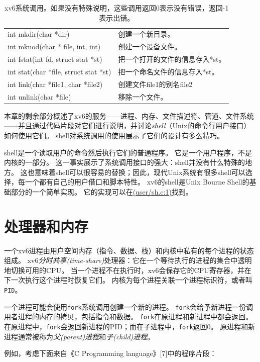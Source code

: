 \begin{table}[htbp]
\begin{tabular}{ll}
        int mkdir(char *dir)  & 创建一个新目录。    \\
        int mknod(char * file, int, int)   & 创建一个设备文件。  \\
        int fstat(int fd, struct stat *st)       & 把一个打开的文件的信息存入*st。  \\
        int stat(char *file, struct stat *st) &  把一个命名文件的信息存入*st。\\
        int link(char *file1, char *file2)    & 创建文件file1的别名file2    \\
        int unlink(char *file)& 移除一个文件。 \\
    \end{tabular}
    \caption{xv6系统调用。如果没有特殊说明，这些调用返回0表示没有错误，返回-1表示出错。}
    \label{t1-1}
\end{table}

本章的剩余部分概述了xv6的服务——进程、内存、文件描述符、管道、文件系统——并且通过代码片段对它们进行说明，并讨论\emph{shell}（Unix的命令行用户接口）如何使用它们。
shell对系统调用的使用展示了它们的设计有多么精巧。

shell是一个读取用户的命令然后执行它们的普通程序。
它是一个用户程序，不是内核的一部分。
这一事实展示了系统调用接口的强大：shell并没有什么特殊的地方。
这也意味着shell可以很容易的替换；因此，现代Unix系统有很多shell可以选择，每一个都有自己的用户借口和脚本特性。
xv6的shell是Unix Bourne Shell的基础部分的一个简单实现。
它的实现可以在\href{https://github.com/mit-pdos/xv6-riscv/blob/riscv//user/sh.c#L1}{(user/sh.c:1)}找到。

\section{处理器和内存}

一个xv6进程由用户空间内存（指令、数据、栈）和内核中私有的每个进程的状态组成。
xv6\emph{分时共享(time-share)}处理器：它在一个等待执行的进程的集合中透明地切换可用的CPU。
当一个进程不在执行时，xv6会保存它的CPU寄存器，并在下一次执行这个进程时恢复它们。
内核为每个进程关联一个进程标识符，或者叫\texttt{PID}。

一个进程可能会使用\texttt{fork}系统调用创建一个新的进程。
\texttt{fork}会给予新进程一份调用者进程的内存的拷贝，包括指令和数据。
\texttt{fork}在原进程和新进程中都会返回。
在原进程中，\texttt{fork}会返回新进程的PID；而在子进程中，\texttt{fork}返回0。
原进程和新进程通常被称为\emph{父(parent)进程}和\emph{子(child)进程}。

例如，考虑下面来自《C Programming language》[7]中的程序片段：

